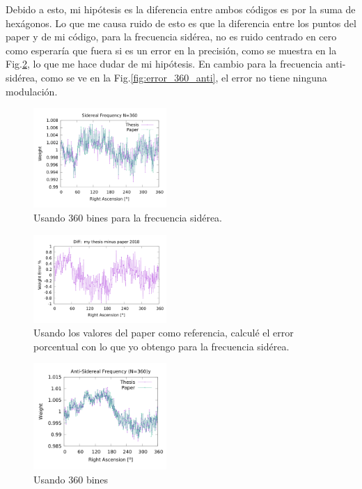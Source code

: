 Debido a esto, mi hipótesis es la diferencia entre ambos códigos es por la suma de hexágonos. Lo que me causa ruido de esto es que la diferencia entre los puntos del paper y de mi código, para la frecuencia sidérea,  no es ruido centrado en cero como esperaría que fuera si es un error en la precisión, como se muestra en la Fig.\ref{fig:error_360_sid}, lo que me hace dudar de mi hipótesis. En cambio para la frecuencia anti-sidérea, como se ve en la Fig.\ref{fig:error_360_anti}, el error no tiene ninguna modulación.

\begin{figure}[H]
	\centering
	\includegraphics[width=0.45\textwidth]{sidereal_my_and_paper_in_360.png}
	\caption{Usando 360 bines para la frecuencia sidérea.}
	\label{fig:sid_360}
\end{figure}


\begin{figure}[H]
	\centering
	\includegraphics[width=0.45\textwidth]{sidereal_my_and_paper_in_360_error.png}
	\caption{Usando los valores del paper como referencia, calculé el error porcentual con lo que yo obtengo para la frecuencia sidérea.}
	\label{fig:error_360_sid}
\end{figure}



\begin{figure}[H]
	\centering
	\includegraphics[width=0.45\textwidth]{anti_my_and_paper_in_360.png}
	\caption{Usando 360 bines}
	\label{fig:anti_360}
\end{figure}


